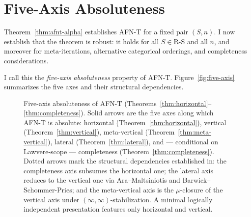 \documentclass[11pt]{article}
\theoremstyle{plain}
\theoremstyle{definition}
\newcommand{\RS}{\mathrm{R\text{-}S}}
\newcommand{\cS}{\mathcal{S}}
\newcommand{\cL}{\mathcal{L}}
\begin{document}
\section{Five-Axis Absoluteness}\label{sec:five-axis}

Theorem~\ref{thm:afnt-alpha} establishes AFN-T for a fixed pair $(S, n)$. I now establish that the theorem is robust: it holds for all $S \in \RS$ and all $n$, and moreover for meta-iterations, alternative categorical orderings, and completeness considerations.

I call this the \emph{five-axis absoluteness} property of AFN-T. Figure~\ref{fig:five-axis} summarizes the five axes and their structural dependencies.

\begin{figure}[ht]
\centering
{}
\caption{Five-axis absoluteness of AFN-T (Theorems~\ref{thm:horizontal}--\ref{thm:completeness}). Solid arrows are the five axes along which AFN-T is absolute: horizontal (Theorem~\ref{thm:horizontal}), vertical (Theorem~\ref{thm:vertical}), meta-vertical (Theorem~\ref{thm:meta-vertical}), lateral (Theorem~\ref{thm:lateral}), and --- conditional on Lawvere-scope --- completeness (Theorem~\ref{thm:completeness}). Dotted arrows mark the structural dependencies established in: the completeness axis subsumes the horizontal one; the lateral axis reduces to the vertical one via Ara--Maltsiniotis and Barwick--Schommer-Pries; and the meta-vertical axis is the $\mu$-closure of the vertical axis under $(\infty, \infty)$-stabilization. A minimal logically independent presentation features only horizontal and vertical.}

\end{figure}
\end{document}
